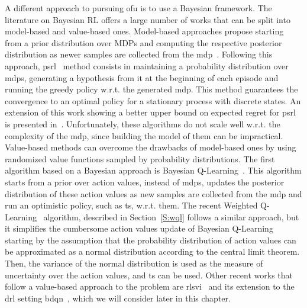 A different approach to pursuing \gls{ofu} is to use a Bayesian framework. The literature on Bayesian RL offers a large number of works that can be split into model-based and value-based ones. Model-based approaches propose starting from a prior distribution over MDPs and computing the respective posterior distribution as newer samples are collected from the \gls{mdp}~\cite{dearden1999model, kolter2009near}. Following this approach, \gls{psrl}~\cite{strens2000bayesian} method consists in maintaining a probability distribution over \glspl{mdp}, generating a hypothesis from it at the beginning of each episode and running the greedy policy w.r.t. the generated \gls{mdp}. This method guarantees the convergence to an optimal policy for a stationary process with discrete states. An extension of this work showing a better upper bound on expected regret for \gls{psrl} is presented in~\cite{osband2013more}. Unfortunately, these algorithms do not scale well w.r.t. the complexity of the \gls{mdp}, since building the model of them can be impractical.
Value-based methods can overcome the drawbacks of model-based ones by using randomized value functions sampled by probability distributions. The first algorithm based on a Bayesian approach is Bayesian Q-Learning~\cite{dearden1998bayesian}. This algorithm starts from a prior over action values, instead of \glspl{mdp}, updates the posterior distribution of these action values as new samples are collected from the \gls{mdp} and run an optimistic policy, such as \gls{ts}, w.r.t. them. The recent Weighted Q-Learning~\cite{deramo2016estimating} algorithm, described in Section~\ref{S:wql} follows a similar approach, but it simplifies the cumbersome action values update of Bayesian Q-Learning starting by the assumption that the probability distribution of action values can be approximated as a normal distribution according to the central limit theorem. Then, the variance of the normal distribution is used as the measure of uncertainty over the action values, and \gls{ts} can be used. 
Other recent works that follow a value-based approach to the problem are \gls{rlsvi}~\cite{osband2016generalization} and its extension to the \gls{drl} setting \gls{bdqn}~\cite{osband2017deep}, which we will consider later in this chapter.

